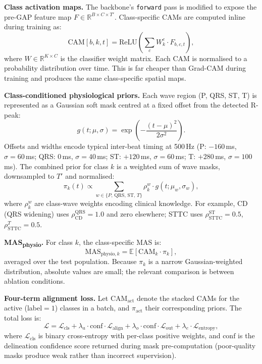 \documentclass{article}
\begin{document}
\textbf{Class activation maps.}
The backbone's \texttt{forward} pass is modified to expose the
pre-GAP feature map $F \in \mathbb{R}^{B \times C \times T'}$.
Class-specific CAMs are computed inline during training as:
\begin{equation}
\mathrm{CAM}[b,k,t] = \mathrm{ReLU}\!\left(\sum_c W_k^c \cdot F_{b,c,t}\right),
\label{eq:cam}
\end{equation}
where $W \in \mathbb{R}^{K \times C}$ is the classifier weight matrix.
Each CAM is normalised to a probability distribution over time. This
is far cheaper than Grad-CAM during training and produces the same
class-specific spatial maps.

\textbf{Class-conditioned physiological priors.}
Each wave region (P, QRS, ST, T) is represented as a Gaussian soft
mask centred at a fixed offset from the detected R-peak:
\begin{equation}
g(t; \mu, \sigma) = \exp\!\left(-\frac{(t-\mu)^2}{2\sigma^2}\right).
\label{eq:gauss}
\end{equation}
Offsets and widths encode typical inter-beat timing at 500\,Hz
(P: $-160$\,ms, $\sigma{=}60$\,ms; QRS: $0$\,ms, $\sigma{=}40$\,ms;
ST: $+120$\,ms, $\sigma{=}60$\,ms; T: $+280$\,ms, $\sigma{=}100$\,ms).
The combined prior for class $k$ is a weighted sum of wave masks,
downsampled to $T'$ and normalised:
\begin{equation}
\pi_k(t) \propto \sum_{w \in \{P,\,\mathrm{QRS},\,\mathrm{ST},\,T\}} \rho^w_k \cdot g(t;\mu_w,\sigma_w),
\label{eq:prior}
\end{equation}
where $\rho^w_k$ are class-wave weights encoding clinical knowledge.
For example, CD (QRS widening) uses $\rho^{\mathrm{QRS}}_{\mathrm{CD}}{=}1.0$
and zero elsewhere; STTC uses $\rho^{\mathrm{ST}}_{\mathrm{STTC}}{=}0.5$,
$\rho^{T}_{\mathrm{STTC}}{=}0.5$.

\textbf{MAS\textsubscript{physio}.}
For class $k$, the class-specific MAS is:
\begin{equation}
\mathrm{MAS}_{\mathrm{physio},k} = \mathbb{E}\!\left[\mathrm{CAM}_k \cdot \pi_k\right],
\label{eq:masphysio}
\end{equation}
averaged over the test population. Because $\pi_k$ is a narrow
Gaussian-weighted distribution, absolute values are small; the
relevant comparison is between ablation conditions.

\textbf{Four-term alignment loss.}
Let $\mathrm{CAM}_{\mathrm{act}}$ denote the stacked CAMs for
the active (label$=1$) classes in a batch, and $\pi_{\mathrm{act}}$
their corresponding priors. The total loss is:
\begin{equation}
\mathcal{L} = \mathcal{L}_{\mathrm{cls}}
+ \lambda_a \cdot \mathrm{conf} \cdot \mathcal{L}_{\mathrm{align}}
+ \lambda_o \cdot \mathrm{conf} \cdot \mathcal{L}_{\mathrm{out}}
+ \lambda_e \cdot \mathcal{L}_{\mathrm{entropy}},
\label{eq:loss}
\end{equation}
where $\mathcal{L}_{\mathrm{cls}}$ is binary cross-entropy with
per-class positive weights, and $\mathrm{conf}$ is the delineation
confidence score returned during mask pre-computation (poor-quality
masks produce weak rather than incorrect supervision).
\end{document}
